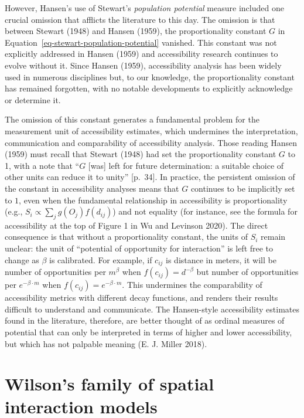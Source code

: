 \documentclass[
]{article}
\begin{document}
However, Hansen's use of Stewart's \emph{population potential} measure
included one crucial omission that afflicts the literature to this day.
The omission is that between Stewart (1948) and Hansen (1959), the
proportionality constant \(G\) in
Equation~\ref{eq-stewart-population-potential} vanished. This constant
was not explicitly addressed in Hansen (1959) and accessibility research
continues to evolve without it. Since Hansen (1959), accessibility
analysis has been widely used in numerous disciplines but, to our
knowledge, the proportionality constant has remained forgotten, with no
notable developments to explicitly acknowledge or determine it.

The omission of this constant generates a fundamental problem for the
measurement unit of accessibility estimates, which undermines the
interpretation, communication and comparability of accessibility
analysis. Those reading Hansen (1959) must recall that Stewart (1948)
had set the proportionality constant \(G\) to 1, with a note that
``\(G\) {[}was{]} left for future determination: a suitable choice of
other units can reduce it to unity'' {[}p.~34{]}. In practice, the
persistent omission of the constant in accessibility analyses means that
\(G\) continues to be implicitly set to \(1\), even when the fundamental
relationship in accessibility is proportionality (e.g.,
\(S_{i} \propto \sum_j g(O_j)f(d_{ij})\)) and not equality (for
instance, see the formula for accessibility at the top of Figure 1 in Wu
and Levinson 2020). The direct consequence is that without a
proportionality constant, the units of \(S_i\) remain unclear: the unit
of ``potential of opportunity for interaction'' is left free to change
as \(\beta\) is calibrated. For example, if \(c_{ij}\) is distance in
meters, it will be number of opportunities per \(m^{\beta}\) when
\(f(c_{ij}) = d^{-\beta}\) but number of opportunities per
\(e^{-\beta\cdot m}\) when \(f(c_{ij}) = e^{-\beta\cdot m}\). This
undermines the comparability of accessibility metrics with different
decay functions, and renders their results difficult to understand and
communicate. The Hansen-style accessibility estimates found in the
literature, therefore, are better thought of as ordinal measures of
potential that can only be interpreted in terms of higher and lower
accessibility, but which has not palpable meaning (E. J. Miller 2018).

\section{Wilson's family of spatial interaction
models}\label{wilsons-family-of-spatial-interaction-models}
\end{document}
